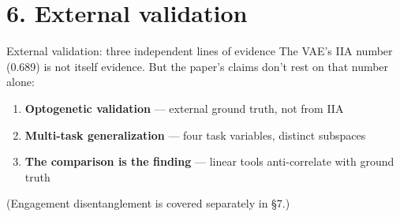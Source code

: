 \documentclass[aspectratio=169,11pt]{beamer}
\begin{document}
\section{6. External validation}\hypertarget{sec:6}{}

\begin{frame}{External validation: three independent lines of evidence}
\vspace{0.3em}
The VAE's IIA number (0.689) is not itself evidence. But the paper's claims don't rest on that number alone:

\vspace{0.5em}
\begin{enumerate}\setlength\itemsep{0.6em}
  \item \textbf{Optogenetic validation} --- external ground truth, not from IIA
  \item \textbf{Multi-task generalization} --- four task variables, distinct subspaces
  \item \textbf{The comparison is the finding} --- linear tools anti-correlate with ground truth
\end{enumerate}

\vspace{0.5em}
{\small (Engagement disentanglement is covered separately in \S7.)}
\end{frame}
\end{document}
